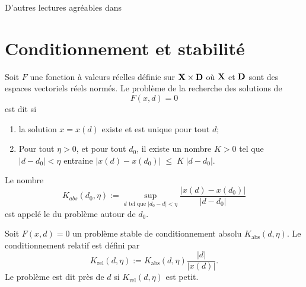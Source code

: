 
D'autres lectures agréables dans \cite{GianlucaB,cmcsNum}

\section{Conditionnement et stabilité}

\begin{definition}

	Soit $F$ une fonction à valeurs réelles définie sur ${\bf X}\times{\bf D}$ o\`u ${\bf X}$ et ${\bf D}$ sont des espaces vectoriels réels normés. Le problème de la recherche des solutions de 
	\begin{equation}
		F(x,d)=0
	\end{equation}
	est dit  si 
	\begin{enumerate}
		\item 
			la solution $x=x(d)$ existe et est unique pour tout $d$;
		\item \label{ItemProbStableB}
			Pour tout $\eta>0$, et pour tout $d_0$, il existe un nombre $K>0$ tel que $|d-d_0|<\eta$ entraine $|x(d)-x(d_0)|\;\leq\;K\;|d-d_0|$.
	\end{enumerate}
\end{definition}
Le nombre 
\begin{equation}		\label{EqDefAABSOLU}
	K_{abs}(d_0,\eta):=\sup_{d\text{ tel que $|d_0-d|<\eta$}}\frac{|x(d)-x(d_0)|}{|d-d_0|}
\end{equation}
est appelé le  du problème autour de $d_0$.

\begin{definition}	
	Soit $F(x,d)=0$ un problème stable de conditionnement absolu $K_{\text{abs}}(d,\eta)$.  Le conditionnement relatif est défini par
	\begin{equation}
		K_{\text{rel}}(d,\eta):=K_{\text{abs}}(d,\eta)\frac{|d|}{|x(d)|}.
	\end{equation}
	Le problème est dit  près de $d$ si $K_{\text{rel}}(d,\eta)$ est petit.
\end{definition}


